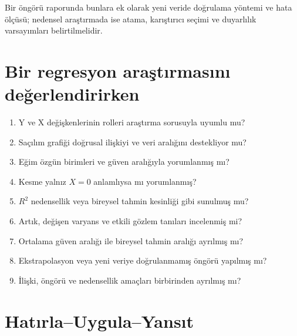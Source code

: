 Bir öngörü raporunda bunlara ek olarak yeni veride doğrulama yöntemi ve hata
ölçüsü; nedensel araştırmada ise atama, karıştırıcı seçimi ve duyarlılık
varsayımları belirtilmelidir.

\section{Bir regresyon araştırmasını değerlendirirken}

\begin{enumerate}
  \item Y ve X değişkenlerinin rolleri araştırma sorusuyla uyumlu mu?
  \item Saçılım grafiği doğrusal ilişkiyi ve veri aralığını destekliyor mu?
  \item Eğim özgün birimleri ve güven aralığıyla yorumlanmış mı?
  \item Kesme yalnız $X=0$ anlamlıysa mı yorumlanmış?
  \item $R^2$ nedensellik veya bireysel tahmin kesinliği gibi sunulmuş mu?
  \item Artık, değişen varyans ve etkili gözlem tanıları incelenmiş mi?
  \item Ortalama güven aralığı ile bireysel tahmin aralığı ayrılmış mı?
  \item Ekstrapolasyon veya yeni veriye doğrulanmamış öngörü yapılmış mı?
  \item İlişki, öngörü ve nedensellik amaçları birbirinden ayrılmış mı?
\end{enumerate}




\section*{Hatırla--Uygula--Yansıt}

